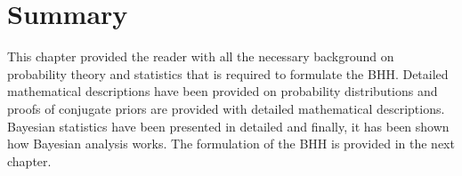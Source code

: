 \section{Summary}
\label{sec:probability:summary}

This chapter provided the reader with all the necessary background on probability theory and statistics that is required to formulate the \acs{BHH}. Detailed mathematical descriptions have been provided on probability distributions and proofs of conjugate priors are provided with detailed mathematical descriptions. Bayesian statistics have been presented in detailed and finally, it has been shown how Bayesian analysis works. The formulation of the \acs{BHH} is provided in the next chapter.